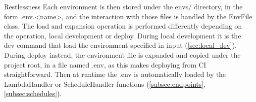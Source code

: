 \begin{chapter}{Restlessness}
    Each environment is then stored under the envs/ directory, in the form .env.<name>,
    and the interaction with those files is handled by the EnvFile class.
    The load and expansion operation is performed differently depending on the operation,
    local development or deploy.
    During local development it is the dev command that load the environment specified
    in input (\ref{sec:local_dev}).
    During deploy instead, the environment file is expanded and copied under the
    project root, in a file named .env, as this makes deploying from CI straightforward.
    Then at runtime the .env is automatically loaded by the LambdaHandler or ScheduleHandler
    functions (\ref{subsec:endpoints}, \ref{subsec:schedules}).

\end{chapter}